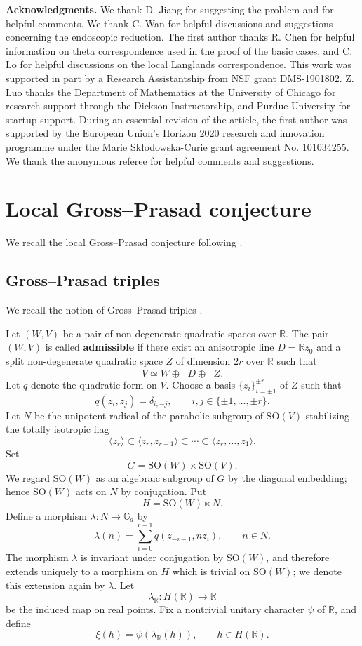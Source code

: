 \documentclass[12pt]{amsart}
\numberwithin{equation}{subsection}
\newcommand{\BG}{{\mathbb {G}}}
\newcommand{\BR}{{\mathbb {R}}}
\newcommand{\SO}{{\mathrm{SO}}}
\def\del{{\delta}}
\def\lam{{\lambda}}
\def\SO{\mathrm{SO}}
\begin{document}
\medskip
\noindent\textbf{Acknowledgments.}
We thank D. Jiang for suggesting the problem and for helpful comments. We thank
C. Wan for helpful discussions and suggestions concerning the
endoscopic reduction. The first author thanks R. Chen for helpful information
on theta correspondence used in the proof of the basic cases, and C. Lo for
helpful discussions on the local Langlands correspondence. This work was
supported in part by a Research Assistantship from NSF grant DMS-1901802.
Z. Luo thanks the Department of Mathematics at the University of Chicago for
research support through the Dickson Instructorship, and Purdue University for
startup support. During an essential revision of the article, the first author
was supported by the European Union's Horizon 2020 research and innovation
programme under the Marie Skłodowska-Curie grant agreement No. 101034255. We
thank the anonymous referee for helpful comments and suggestions.





\section{Local Gross--Prasad conjecture}\label{sec:localgp}

We recall the local Gross--Prasad conjecture following \cite{MR1186476,MR1295124}.

\subsection{Gross--Prasad triples}\label{subsec:gptriples}

We recall the notion of Gross--Prasad triples
\cite[\S 6]{thesis_zhilin}.

Let $(W,V)$ be a pair of non-degenerate quadratic spaces over $\BR$. The pair
$(W,V)$ is called \textbf{admissible} if there exist an anisotropic line
$D=\BR z_0$ and a split non-degenerate quadratic space $Z$ of dimension $2r$
over $\BR$ such that
\[
V\simeq W\oplus^\perp D\oplus^\perp Z.
\]
Let $q$ denote the quadratic form on $V$. Choose a basis $\{z_i\}_{i=\pm 1}^{\pm r}$ of $Z$ such that
\[
q(z_i,z_j)=\del_{i,-j},\qquad i,j\in \{\pm 1,\ldots,\pm r\}.
\]
Let $N$ be the unipotent radical of the parabolic subgroup of $\SO(V)$
stabilizing the totally isotropic flag
\[
\langle z_r\rangle
\subset
\langle z_r,z_{r-1}\rangle
\subset \cdots \subset
\langle z_r,\ldots,z_1\rangle .
\]
Set
\[
G=\SO(W)\times \SO(V).
\]
We regard $\SO(W)$ as an algebraic subgroup of $G$ by the diagonal embedding;
hence $\SO(W)$ acts on $N$ by conjugation. Put
\[
H=\SO(W)\ltimes N.
\]
Define a morphism $\lam:N\to \BG_a$ by
\[
\lam(n)=\sum_{i=0}^{r-1}q(z_{-i-1},nz_i),\qquad n\in N.
\]
The morphism $\lam$ is invariant under conjugation by $\SO(W)$, and therefore
extends uniquely to a morphism on $H$ which is trivial on $\SO(W)$; we denote
this extension again by $\lam$. Let
\[
\lam_\BR:H(\BR)\to \BR
\]
be the induced map on real points. Fix a nontrivial unitary character $\psi$ of
$\BR$, and define
\[
\xi(h)=\psi(\lam_\BR(h)),\qquad h\in H(\BR).
\]
\end{document}
